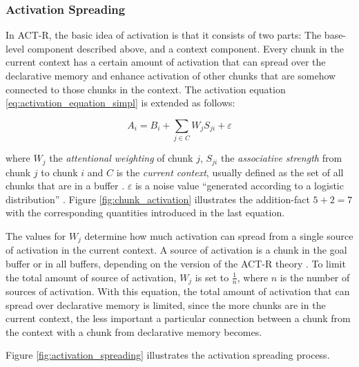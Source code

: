 \subsubsection{Activation Spreading}

In ACT-R, the basic idea of activation is that it consists of two parts: The base-level component described above, and a context component. Every chunk in the current context has a certain amount of activation that can spread over the declarative memory and enhance activation of other chunks that are somehow connected to those chunks in the context. The activation equation \eqref{eq:activation_equation_simpl} is extended as follows:

\begin{equation}
\label{eq:activation_equation}
 A_i = B_i + \sum_{j \in C}{W_j S_{ji}} + \varepsilon
\end{equation}

where $W_j$ the \emph{attentional weighting} of chunk $j$, $S_{ji}$ the \emph{associative strength} from chunk $j$ to chunk $i$ and $C$ is the \emph{current context}\label{current_context}, usually defined as the set of all chunks that are in a buffer \cites[1042]{anderson_integrated_2004}[33]{taatgen_modeling_2006}[unit 5]{actr_tutorial}. $\varepsilon$ is a noise value ``generated according to a logistic distribution'' \cite[unit 4, p. 4]{actr_tutorial}. Figure \ref{fig:chunk_activation} illustrates the addition-fact $5 + 2 = 7$ with the corresponding quantities introduced in the last equation. 

The values for $W_j$ determine how much activation can spread from a single source of activation in the current context. A source of activation is a chunk in the goal buffer or in all buffers, %
depending on the version of the ACT-R theory \cites[1042]{anderson_integrated_2004}[33]{taatgen_modeling_2006}[unit 5, p. 1]{actr_tutorial}. To limit the total amount of source of activation, $W_j$ is set to $\frac{1}{n}$, where $n$ is the number of sources of activation. With this equation, the total amount of activation that can spread over declarative memory is limited, since the more chunks are in the current context, the less important a particular connection between a chunk from the context with a chunk from declarative memory becomes.

Figure \ref{fig:activation_spreading} illustrates the activation spreading process.

